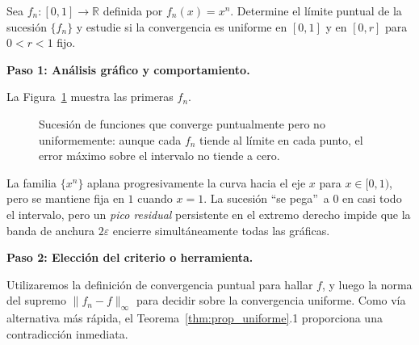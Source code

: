 \begin{example}
Sea $f_n\colon[0,1]\to\mathbb{R}$ definida por $f_n(x)=x^n$.
Determine el límite puntual de la sucesión $\{f_n\}$ y estudie si
la convergencia es uniforme en $[0,1]$ y en $[0,r]$ para $0<r<1$ fijo.
\begin{myproof}
\textbf{Paso 1: Análisis gráfico y comportamiento.}

La Figura~\ref{fig:ssf_puntual_no_uniforme} muestra las primeras $f_n$.

\begin{figure}[H]
\centering
{}
\caption{Sucesión de funciones que converge puntualmente pero no uniformemente: aunque cada $f_n$ tiende al límite en cada punto, el error máximo sobre el intervalo no tiende a cero.}
\label{fig:ssf_puntual_no_uniforme}
\end{figure}

La familia $\{x^n\}$ aplana progresivamente la curva hacia el eje $x$
para $x \in [0,1)$, pero se mantiene fija en $1$ cuando $x=1$. La
sucesión \textquotedblleft se pega\textquotedblright\ a $0$ en casi
todo el intervalo, pero un \emph{pico residual} persistente en el
extremo derecho impide que la banda de anchura $2\varepsilon$ encierre
simultáneamente todas las gráficas.

\textbf{Paso 2: Elección del criterio o herramienta.}

Utilizaremos la definición de convergencia puntual para hallar $f$, y
luego la norma del supremo $\|f_n - f\|_\infty$ para decidir sobre la
convergencia uniforme. Como vía alternativa más rápida, el
Teorema~\ref{thm:prop_uniforme}.1 proporciona una contradicción
inmediata.


\end{myproof}
\end{example}
